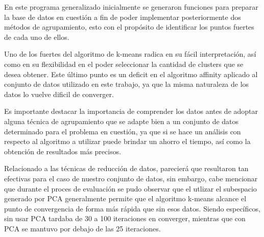 En este programa generalizado inicialmente se generaron funciones para preparar la base de datos en cuestión a fin de poder implementar posteriormente dos métodos de agrupamiento, esto con el propósito de identificar los puntos fuertes de cada uno de ellos.

Uno de los fuertes del algoritmo de k-means radica en su fácil interpretación, así como en su flexibilidad en el poder seleccionar la cantidad de clusters que se desea obtener. Este último punto es un deficit en el algoritmo affinity aplicado al conjunto de datos utilizado en este trabajo, ya que la misma naturaleza de los datos lo vuelve dificil de converger.

Es importante destacar la importancia de comprender los datos antes de adoptar alguna técnica de agrupamiento que se adapte bien a un conjunto de datos determinado para el problema en cuestión, ya que si se hace un análisis con respecto al algoritmo a utilizar puede brindar un ahorro el tiempo, así como la obtención de resultados más precisos.

Relacionado a las técnicas de reducción de datos, parecierá que resultaron tan efectivas para el caso de nuestro conjunto de datos, sin embargo, cabe mencionar que durante el proces de evaluación se pudo observar que el utlizar el subespacio generado por PCA generalmente permite que el algoritmo k-means alcance el punto de convergencia de forma más rápida que sin esos datos. Siendo específicos, sin usar PCA tardaba de 30 a 100 iteraciones en converger, mientras que con PCA se mantuvo por debajo de las 25 iteraciones.